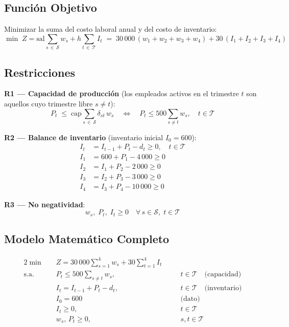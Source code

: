 \documentclass[12pt,a4paper]{article}
\newcommand{\cset}[1]{\mathcal{#1}}            %
\begin{document}
\subsection{Función Objetivo}

\begin{fobox}
Minimizar la suma del costo laboral anual y del costo de inventario:
\[
  \min\; Z = \text{sal}\sum_{s\,\in\,\cset{S}} w_s
           + h\sum_{t\,\in\,\cset{T}} I_t
  \;=\; 30\,000\,(w_1+w_2+w_3+w_4) + 30\,(I_1+I_2+I_3+I_4)
\]
\end{fobox}

\subsection{Restricciones}

\begin{restbox}
\textbf{R1 — Capacidad de producción}
(los empleados activos en el trimestre $t$ son aquellos cuyo trimestre libre $s\neq t$):
\[
  P_t \;\leq\; \text{cap}\sum_{s\,\in\,\cset{S}} \delta_{st}\,w_s
  \quad\Leftrightarrow\quad
  P_t \leq 500\sum_{s \neq t} w_s, \quad t \in \cset{T}
\]

\textbf{R2 — Balance de inventario} (inventario inicial $I_0 = 600$):
\begin{align*}
  I_t &= I_{t-1} + P_t - d_t \geq 0, \quad t \in \cset{T}\\
  I_1 &= 600 + P_1 - 4\,000 \geq 0\\
  I_2 &= I_1 + P_2 - 2\,000 \geq 0\\
  I_3 &= I_2 + P_3 - 3\,000 \geq 0\\
  I_4 &= I_3 + P_4 - 10\,000 \geq 0
\end{align*}

\textbf{R3 — No negatividad}:
\[
  w_s,\; P_t,\; I_t \geq 0 \quad \forall\, s \in \cset{S},\; t \in \cset{T}
\]
\end{restbox}

\subsection{Modelo Matemático Completo}

\begin{modelbox}
\begin{alignat*}{2}
  \min\quad & Z = 30\,000\!\sum_{s=1}^{4} w_s + 30\!\sum_{t=1}^{4} I_t\\[4pt]
  \text{s.a.}\quad
  & P_t \leq 500\!\sum_{s \neq t} w_s, &\quad& t \in \cset{T} \quad\text{(capacidad)}\\
  & I_t = I_{t-1} + P_t - d_t,        &\quad& t \in \cset{T} \quad\text{(inventario)}\\
  & I_0 = 600                          &\quad& \text{(dato)}\\
  & I_t \geq 0,                        &\quad& t \in \cset{T}\\
  & w_s,\,P_t \geq 0,                  &\quad& s,t \in \cset{T}
\end{alignat*}
\end{modelbox}
\end{document}
